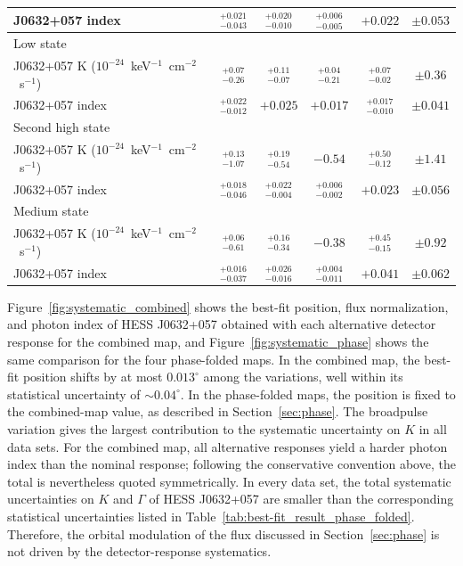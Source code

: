 \documentclass[10pt,letter]{article}
\begin{document}
\begin{table}[H]
{\begin{tabular}{l|cccc|c}
J0632+057 index & $^{+0.021}_{-0.043}$ & $^{+0.020}_{-0.010}$ & $^{+0.006}_{-0.005}$ & $+0.022$ & $\pm0.053$ \\
\hline\hline
\multicolumn{6}{l}{Low state} \\
\hline
J0632+057 K ($10^{-24}$~keV$^{-1}$~cm$^{-2}$~s$^{-1}$) & $^{+0.07}_{-0.26}$ & $^{+0.11}_{-0.07}$ & $^{+0.04}_{-0.21}$ & $^{+0.07}_{-0.02}$ & $\pm0.36$ \\
J0632+057 index & $^{+0.022}_{-0.012}$ & $+0.025$ & $+0.017$ & $^{+0.017}_{-0.010}$ & $\pm0.041$ \\
\hline\hline
\multicolumn{6}{l}{Second high state} \\
\hline
J0632+057 K ($10^{-24}$~keV$^{-1}$~cm$^{-2}$~s$^{-1}$) & $^{+0.13}_{-1.07}$ & $^{+0.19}_{-0.54}$ & $-0.54$ & $^{+0.50}_{-0.12}$ & $\pm1.41$ \\
J0632+057 index & $^{+0.018}_{-0.046}$ & $^{+0.022}_{-0.004}$ & $^{+0.006}_{-0.002}$ & $+0.023$ & $\pm0.056$ \\
\hline\hline
\multicolumn{6}{l}{Medium state} \\
\hline
J0632+057 K ($10^{-24}$~keV$^{-1}$~cm$^{-2}$~s$^{-1}$) & $^{+0.06}_{-0.61}$ & $^{+0.16}_{-0.34}$ & $-0.38$ & $^{+0.45}_{-0.15}$ & $\pm0.92$ \\
J0632+057 index & $^{+0.016}_{-0.037}$ & $^{+0.026}_{-0.016}$ & $^{+0.004}_{-0.011}$ & $+0.041$ & $\pm0.062$ \\
\hline
\end{tabular}
}
\end{table}

Figure~\ref{fig:systematic_combined} shows the best-fit position, flux normalization, and photon index of HESS J0632+057 obtained with each alternative detector response for the combined map, and Figure~\ref{fig:systematic_phase} shows the same comparison for the four phase-folded maps. In the combined map, the best-fit position shifts by at most $0.013^\circ$ among the variations, well within its statistical uncertainty of $\sim0.04^\circ$. In the phase-folded maps, the position is fixed to the combined-map value, as described in Section~\ref{sec:phase}. The broadpulse variation gives the largest contribution to the systematic uncertainty on $K$ in all data sets. For the combined map, all alternative responses yield a harder photon index than the nominal response; following the conservative convention above, the total is nevertheless quoted symmetrically. In every data set, the total systematic uncertainties on $K$ and $\Gamma$ of HESS J0632+057 are smaller than the corresponding statistical uncertainties listed in Table~\ref{tab:best-fit_result_phase_folded}. Therefore, the orbital modulation of the flux discussed in Section~\ref{sec:phase} is not driven by the detector-response systematics.
\end{document}
